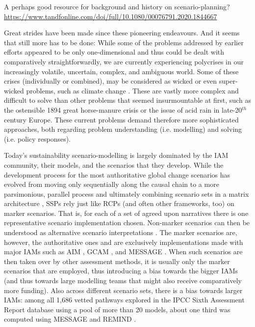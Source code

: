 \documentclass{article}
\begin{document}
\begin{refsection}
A perhaps good resource for background and history on scenario-planning? \url{https://www.tandfonline.com/doi/full/10.1080/00076791.2020.1844667}


Great strides have been made since these pioneering endeavours. And it seems that still more has to be done: While some of the problems addressed by earlier efforts appeared to be only one-dimensional and thus could be dealt with comparatively straightforwardly, we are currently experiencing polycrises in our increasingly volatile, uncertain, complex, and ambiguous world. Some of these crises (individually or combined), may be considered as wicked \parencite{rittel_1973, termeer_2019,lonngren_2021} or even super-wicked problems, such as climate change \parencite{levin_2012}. These are vastly more complex and difficult to solve than other problems that seemed insurmountable at first, such as the ostensible 1894 great horse-manure crisis or the issue of acid rain in late-20$^{th}$ century Europe. These current problems demand therefore more sophisticated approaches, both regarding problem understanding (i.e. modelling) and solving (i.e. policy responses). 

Today's sustainability scenario-modelling is largely dominated by the IAM community, their models, and the scenarios that they develop. While the development process for the most authoritative global change scenarios has evolved from moving only sequentially along the causal chain to a more parsimonious, parallel process \parencite{moss_2010} and ultimately combining scenario sets in a matrix architecture \parencite{vanvuuren_2014},\footnotemark{} SSPs rely just like RCPs (and often other frameworks, too) on marker scenarios. That is, for each of a set of agreed upon narratives there is one representative scenario implementation chosen. Non-marker scenarios can then be understood as alternative scenario interpretations \parencite{riahi_2017}. The marker scenarios are, however, the authoritative ones and are exclusively implementations made with major IAMs such as AIM \parencite{fujimori_2017}, GCAM \parencite{calvin_2017}, and MESSAGE \parencite{fricko_20171}. When such scenarios are then taken over by other assessment methods, it is usually only the marker scenarios that are employed, thus introducing a bias towards the bigger IAMs (and thus towards large modelling teams that might also receive comparatively more funding). Also across different scenario sets, there is a bias towards larger IAMs: among all 1,686 vetted pathways explored in the IPCC Sixth Assessment Report database using a pool of more than 20 models, about one third was computed using MESSAGE and REMIND \parencite{gambhir_2022,byers_2022}.


\end{refsection}
\end{document}
